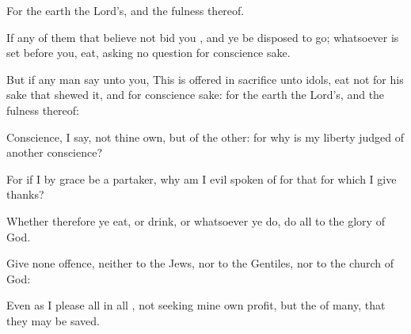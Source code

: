 {For the
earth
{} the
Lord’s,
and the
fulness
thereof.

If
any of
them that believe
not
bid
you
{},
and ye be
disposed to
go;
whatsoever is set
before
you,
eat,
asking
no
question
for conscience
sake.

But
if any
man
say unto
you,
This
is offered in sacrifice unto
idols,
eat
not
for his sake
that shewed
it,
and for conscience
sake:
for the
earth
{} the
Lord’s,
and the
fulness
thereof:

Conscience, I
say,
not thine
own,
but of the
other:
for
why is
my
liberty
judged
of
another
{}
conscience?

For
if
I by
grace be a
partaker,
why am I evil spoken
of
for that for
which
I give
thanks?

Whether
therefore ye
eat,
or
drink,
or
whatsoever ye
do,
do
all
to the
glory of
God.

Give none
offence,
neither to the
Jews,
nor to the
Gentiles,
nor to the
church of
God:

Even
as
I
please
all
{} in
all
{},
not
seeking mine
own
profit,
but
the
{} of
many,
that they may be
saved.




\par }
